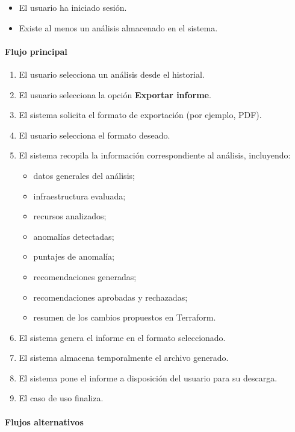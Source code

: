 \begin{itemize}
\item El usuario ha iniciado sesión.
\item Existe al menos un análisis almacenado en el sistema.
\end{itemize}

\paragraph*{Flujo principal}

\begin{enumerate}
\item El usuario selecciona un análisis desde el historial.
\item El usuario selecciona la opción \textbf{Exportar informe}.
\item El sistema solicita el formato de exportación (por ejemplo, PDF).
\item El usuario selecciona el formato deseado.
\item El sistema recopila la información correspondiente al análisis, incluyendo:
  \begin{itemize}
  \item datos generales del análisis;
  \item infraestructura evaluada;
  \item recursos analizados;
  \item anomalías detectadas;
  \item puntajes de anomalía;
  \item recomendaciones generadas;
  \item recomendaciones aprobadas y rechazadas;
  \item resumen de los cambios propuestos en Terraform.
  \end{itemize}
\item El sistema genera el informe en el formato seleccionado.
\item El sistema almacena temporalmente el archivo generado.
\item El sistema pone el informe a disposición del usuario para su descarga.
\item El caso de uso finaliza.
\end{enumerate}

\paragraph*{Flujos alternativos}

